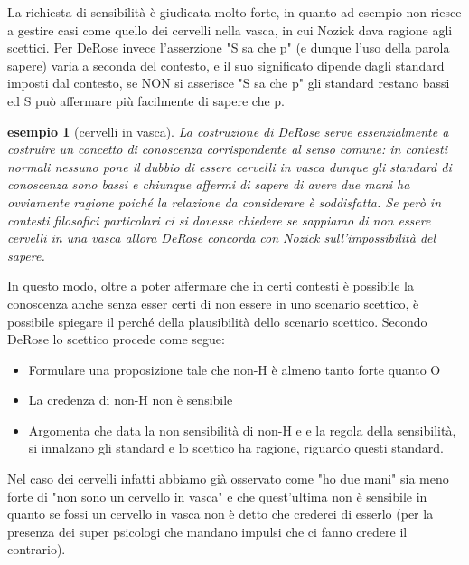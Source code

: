\documentclass[10pt,a4paper]{article}
\newtheorem{esempio}{esempio}
\begin{document}
La richiesta di sensibilità è giudicata molto forte, in quanto ad esempio non riesce a gestire casi come quello dei cervelli nella vasca, in cui Nozick dava ragione agli scettici. Per DeRose invece l'asserzione "S sa che p" (e dunque l'uso della parola sapere) varia a seconda del contesto, e il suo significato dipende dagli standard imposti dal contesto, se NON si asserisce "S sa che p" gli standard restano bassi ed S può affermare più facilmente di sapere che p.
\begin{esempio}[cervelli in vasca]
	La costruzione di DeRose serve essenzialmente a costruire un concetto di conoscenza corrispondente al senso comune: in contesti normali nessuno pone il dubbio di essere cervelli in vasca dunque gli standard di conoscenza sono bassi e chiunque affermi di sapere di avere due mani ha ovviamente ragione poiché la relazione da considerare è soddisfatta. Se però in contesti filosofici particolari ci si dovesse chiedere se sappiamo di non essere cervelli in una vasca allora DeRose concorda con Nozick sull'impossibilità del sapere. 
\end{esempio}
In questo modo, oltre a poter affermare che in certi contesti è possibile la conoscenza anche senza esser certi di non essere in uno scenario scettico, è possibile spiegare il perché della plausibilità dello scenario scettico. Secondo DeRose lo scettico procede come segue:
\begin{itemize}
	\item Formulare una proposizione tale che non-H è almeno tanto forte quanto O
	\item La credenza di non-H non è sensibile 
	\item Argomenta che data la non sensibilità di non-H e e la regola della sensibilità, si innalzano gli standard e lo scettico ha ragione, riguardo questi standard.
\end{itemize}
Nel caso dei cervelli infatti abbiamo già osservato come "ho due mani" sia meno forte di "non sono un cervello in vasca" e che quest'ultima non è sensibile in quanto se fossi un cervello in vasca non è detto che crederei di esserlo (per la presenza dei super psicologi che mandano impulsi che ci fanno credere il contrario).
\end{document}
